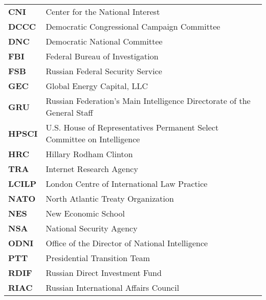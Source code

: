 \begin{longtable}{ p{} p{} }

    \textbf{CNI} & Center for the National Interest \\

    \textbf{DCCC} & Democratic Congressional Campaign Committee \\

    \textbf{DNC} & Democratic National Committee \\

    \textbf{FBI} & Federal Bureau of Investigation \\

    \textbf{FSB} & Russian Federal Security Service \\

    \textbf{GEC} & Global Energy Capital, LLC \\

    \textbf{GRU} & Russian Federation's Main Intelligence Directorate of the General Staff \\

    \textbf{HPSCI} & U.S. House of Representatives Permanent Select Committee on Intelligence \\

    \textbf{HRC} & Hillary Rodham Clinton \\

    \textbf{TRA} & Internet Research Agency \\

    \textbf{LCILP} & London Centre of International Law Practice \\

    \textbf{NATO} & North Atlantic Treaty Organization \\

    \textbf{NES} & New Economic School \\

    \textbf{NSA} & National Security Agency \\

    \textbf{ODNI} & Office of the Director of National Intelligence \\

    \textbf{PTT} & Presidential Transition Team \\

    \textbf{RDIF} & Russian Direct Investment Fund \\

    \textbf{RIAC} & Russian International Affairs Council \\


\end{longtable}
